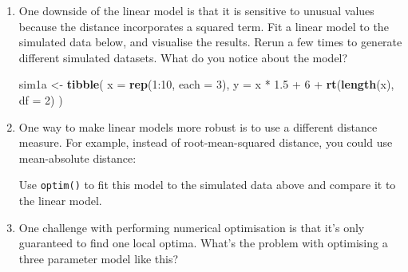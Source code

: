 \documentclass[]{book}
\newenvironment{Shaded}{\begin{snugshade}}{\end{snugshade}}
\newcommand{\KeywordTok}[1]{\textcolor[rgb]{0.13,0.29,0.53}{\textbf{{#1}}}}
\newcommand{\DataTypeTok}[1]{\textcolor[rgb]{0.13,0.29,0.53}{{#1}}}
\newcommand{\DecValTok}[1]{\textcolor[rgb]{0.00,0.00,0.81}{{#1}}}
\newcommand{\FloatTok}[1]{\textcolor[rgb]{0.00,0.00,0.81}{{#1}}}
\newcommand{\StringTok}[1]{\textcolor[rgb]{0.31,0.60,0.02}{{#1}}}
\newcommand{\NormalTok}[1]{{#1}}
\begin{document}
\begin{enumerate}
\def\labelenumi{\arabic{enumi}.}
\item
  One downside of the linear model is that it is sensitive to unusual
  values because the distance incorporates a squared term. Fit a linear
  model to the simulated data below, and visualise the results. Rerun a
  few times to generate different simulated datasets. What do you notice
  about the model?

\begin{Shaded}
\begin{Highlighting}[]
\NormalTok{sim1a <-}\StringTok{ }\KeywordTok{tibble}\NormalTok{(}
  \DataTypeTok{x =} \KeywordTok{rep}\NormalTok{(}\DecValTok{1}\NormalTok{:}\DecValTok{10}\NormalTok{, }\DataTypeTok{each =} \DecValTok{3}\NormalTok{),}
  \DataTypeTok{y =} \NormalTok{x *}\StringTok{ }\FloatTok{1.5} \NormalTok{+}\StringTok{ }\DecValTok{6} \NormalTok{+}\StringTok{ }\KeywordTok{rt}\NormalTok{(}\KeywordTok{length}\NormalTok{(x), }\DataTypeTok{df =} \DecValTok{2}\NormalTok{)}
\NormalTok{)}
\end{Highlighting}
\end{Shaded}
\item
  One way to make linear models more robust is to use a different
  distance measure. For example, instead of root-mean-squared distance,
  you could use mean-absolute distance:

\begin{Shaded}
\end{Shaded}

  Use \texttt{optim()} to fit this model to the simulated data above and
  compare it to the linear model.
\item
  One challenge with performing numerical optimisation is that it's only
  guaranteed to find one local optima. What's the problem with
  optimising a three parameter model like this?

\begin{Shaded}
\end{Shaded}
\end{enumerate}
\end{document}
